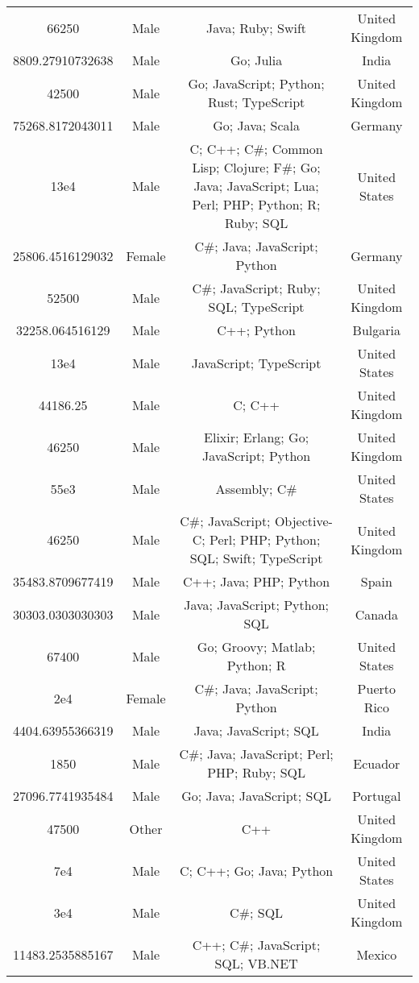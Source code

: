 \begin{center}
\begin{tabular}{ |c|c|c|c| }
66250  &  Male  &  Java; Ruby; Swift  &  United Kingdom  \\ 
8809.27910732638  &  Male  &  Go; Julia  &  India  \\ 
42500  &  Male  &  Go; JavaScript; Python; Rust; TypeScript  &  United Kingdom  \\ 
75268.8172043011  &  Male  &  Go; Java; Scala  &  Germany  \\ 
13e4  &  Male  &  C; C++; C\#; Common Lisp; Clojure; F\#; Go; Java; JavaScript; Lua; Perl; PHP; Python; R; Ruby; SQL  &  United States  \\ 
25806.4516129032  &  Female  &  C\#; Java; JavaScript; Python  &  Germany  \\ 
52500  &  Male  &  C\#; JavaScript; Ruby; SQL; TypeScript  &  United Kingdom  \\ 
32258.064516129  &  Male  &  C++; Python  &  Bulgaria  \\ 
13e4  &  Male  &  JavaScript; TypeScript  &  United States  \\ 
44186.25  &  Male  &  C; C++  &  United Kingdom  \\ 
46250  &  Male  &  Elixir; Erlang; Go; JavaScript; Python  &  United Kingdom  \\ 
55e3  &  Male  &  Assembly; C\#  &  United States  \\ 
46250  &  Male  &  C\#; JavaScript; Objective-C; Perl; PHP; Python; SQL; Swift; TypeScript  &  United Kingdom  \\ 
35483.8709677419  &  Male  &  C++; Java; PHP; Python  &  Spain  \\ 
30303.0303030303  &  Male  &  Java; JavaScript; Python; SQL  &  Canada  \\ 
67400  &  Male  &  Go; Groovy; Matlab; Python; R  &  United States  \\ 
2e4  &  Female  &  C\#; Java; JavaScript; Python  &  Puerto Rico  \\ 
4404.63955366319  &  Male  &  Java; JavaScript; SQL  &  India  \\ 
1850  &  Male  &  C\#; Java; JavaScript; Perl; PHP; Ruby; SQL  &  Ecuador  \\ 
27096.7741935484  &  Male  &  Go; Java; JavaScript; SQL  &  Portugal  \\ 
47500  &  Other  &  C++  &  United Kingdom  \\ 
7e4  &  Male  &  C; C++; Go; Java; Python  &  United States  \\ 
3e4  &  Male  &  C\#; SQL  &  United Kingdom  \\ 
11483.2535885167  &  Male  &  C++; C\#; JavaScript; SQL; VB.NET  &  Mexico  \\ 

\end{tabular}
\end{center}
